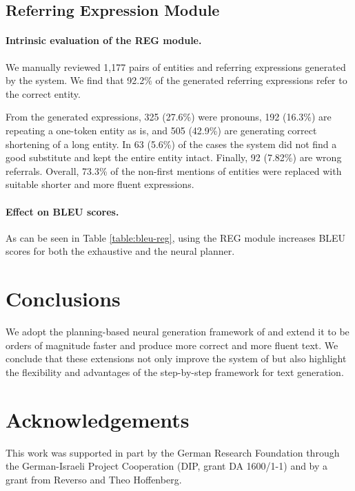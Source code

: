 \documentclass[11pt,a4paper,table,xcdraw]{article}
\begin{document}
\subsection{Referring Expression Module}\label{eval:reg}

\paragraph{Intrinsic evaluation of the REG module.}
We manually reviewed 1,177 pairs of entities and referring expressions generated by the system.
We find that 92.2\% of the generated referring expressions refer to the correct entity.

From the generated expressions, 325 (27.6\%) were pronouns, 192 (16.3\%) are repeating a one-token entity as is, and 505 (42.9\%) are generating correct shortening of a long entity. In 63 (5.6\%) of the cases the system did not find a good substitute and kept the entire entity intact. Finally, 92 (7.82\%) are wrong referrals. Overall, 73.3\% of the non-first mentions of entities were replaced with suitable shorter and more fluent expressions.

\paragraph{Effect on BLEU scores.}
As can be seen in Table \ref{table:bleu-reg}, using the REG module increases BLEU scores for both the exhaustive and the neural planner.


\section{Conclusions}
We adopt the planning-based neural generation framework of \citet{step-by-step} and extend it to be orders of magnitude faster and produce more correct and more fluent text. We conclude that these extensions not only improve the system of \citet{step-by-step} but also highlight the flexibility and advantages of the step-by-step framework for text generation. 

\clearpage

\section*{Acknowledgements}
This work was supported in part by the German Research Foundation through the German-Israeli Project Cooperation (DIP, grant DA 1600/1-1) and by a grant from Reverso and Theo Hoffenberg.
\end{document}
